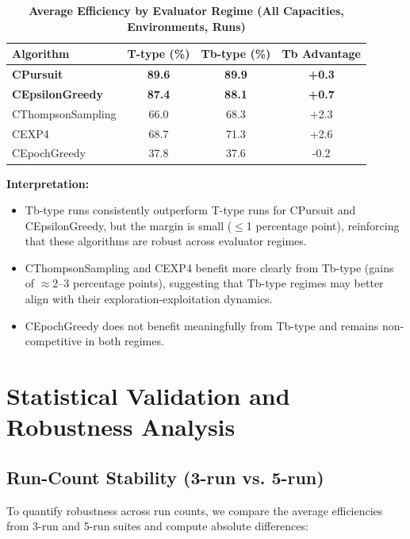 \documentclass[12pt,a4paper]{article}
\newcommand{\performance}[1]{\textcolor{performancecolor}{\textbf{#1}}}
\begin{document}
\begin{table}[H]
\centering
\caption{\performance{Average Efficiency by Evaluator Regime (All Capacities, Environments, Runs)}}
\label{tab:regime-comparison}
\begin{tabular}{|l|c|c|c|}
\hline
\textbf{Algorithm} & \textbf{T-type (\%)} & \textbf{Tb-type (\%)} & \textbf{Tb Advantage} \\
\hline
\hline
\performance{CPursuit}        & \performance{89.6} & \performance{89.9} & \performance{+0.3} \\
\performance{CEpsilonGreedy} & \performance{87.4} & \performance{88.1} & \performance{+0.7} \\
CThompsonSampling            & 66.0              & 68.3              & +2.3 \\
CEXP4                        & 68.7              & 71.3              & +2.6 \\
CEpochGreedy                 & 37.8              & 37.6              & -0.2 \\
\hline
\end{tabular}
\end{table}

\textbf{Interpretation:}
\begin{itemize}
\item Tb-type runs consistently outperform T-type runs for CPursuit and CEpsilonGreedy, but the margin is small ($\leq$1 percentage point), reinforcing that these algorithms are robust across evaluator regimes.
\item CThompsonSampling and CEXP4 benefit more clearly from Tb-type (gains of $\approx$2–3 percentage points), suggesting that Tb-type regimes may better align with their exploration-exploitation dynamics.
\item CEpochGreedy does not benefit meaningfully from Tb-type and remains non-competitive in both regimes.
\end{itemize}

\section{Statistical Validation and Robustness Analysis}

\subsection{Run-Count Stability (3-run vs. 5-run)}

To quantify robustness across run counts, we compare the average efficiencies from 3-run and 5-run suites and compute absolute differences:
\end{document}
